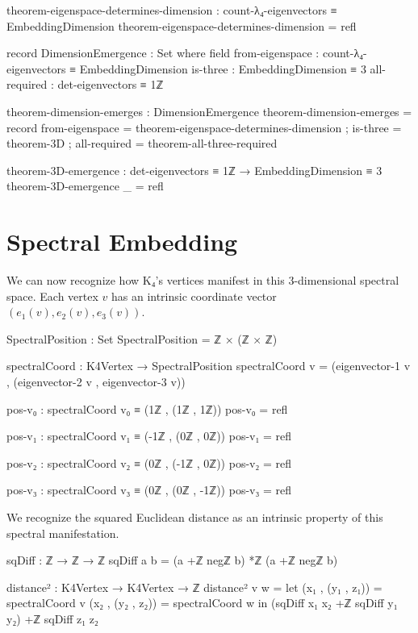 \documentclass[11pt,a4paper]{book}
\begin{document}
\begin{code}
theorem-eigenspace-determines-dimension : 
  count-λ₄-eigenvectors ≡ EmbeddingDimension
theorem-eigenspace-determines-dimension = refl

record DimensionEmergence : Set where
  field
    from-eigenspace : count-λ₄-eigenvectors ≡ EmbeddingDimension
    is-three        : EmbeddingDimension ≡ 3
    all-required    : det-eigenvectors ≡ 1ℤ

theorem-dimension-emerges : DimensionEmergence
theorem-dimension-emerges = record
  { from-eigenspace = theorem-eigenspace-determines-dimension
  ; is-three = theorem-3D
  ; all-required = theorem-all-three-required
  }

theorem-3D-emergence : det-eigenvectors ≡ 1ℤ → EmbeddingDimension ≡ 3
theorem-3D-emergence _ = refl

\end{code}

\section{Spectral Embedding}

We can now recognize how K₄'s vertices manifest in this 3-dimensional spectral space. Each vertex $v$ has an intrinsic coordinate vector $(e_1(v), e_2(v), e_3(v))$.

\begin{code}
SpectralPosition : Set
SpectralPosition = ℤ × (ℤ × ℤ)

spectralCoord : K4Vertex → SpectralPosition
spectralCoord v = (eigenvector-1 v , (eigenvector-2 v , eigenvector-3 v))

pos-v₀ : spectralCoord v₀ ≡ (1ℤ , (1ℤ , 1ℤ))
pos-v₀ = refl

pos-v₁ : spectralCoord v₁ ≡ (-1ℤ , (0ℤ , 0ℤ))
pos-v₁ = refl

pos-v₂ : spectralCoord v₂ ≡ (0ℤ , (-1ℤ , 0ℤ))
pos-v₂ = refl

pos-v₃ : spectralCoord v₃ ≡ (0ℤ , (0ℤ , -1ℤ))
pos-v₃ = refl
\end{code}

We recognize the squared Euclidean distance as an intrinsic property of this spectral manifestation.

\begin{code}
sqDiff : ℤ → ℤ → ℤ
sqDiff a b = (a +ℤ negℤ b) *ℤ (a +ℤ negℤ b)

distance² : K4Vertex → K4Vertex → ℤ
distance² v w = 
  let (x₁ , (y₁ , z₁)) = spectralCoord v
      (x₂ , (y₂ , z₂)) = spectralCoord w
  in (sqDiff x₁ x₂ +ℤ sqDiff y₁ y₂) +ℤ sqDiff z₁ z₂

\end{code}
\end{document}
